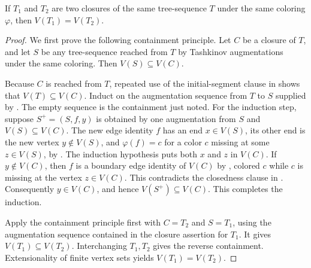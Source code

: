 \begin{lemma}
If $T_1$ and $T_2$ are two closures of the same tree-sequence $T$ under
the same coloring $\varphi$, then $V(T_1)=V(T_2)$.
\end{lemma}
\begin{proof}
We first prove the following containment principle.  Let $C$ be a closure
of $T$, and let $S$ be any tree-sequence reached from $T$ by Tashkinov
augmentations under the same coloring.  Then $V(S)\subseteq V(C)$.

Because $C$ is reached from $T$, repeated use of the initial-segment clause
in  shows that $V(T)\subseteq V(C)$.  Induct
on the augmentation sequence from $T$ to $S$ supplied by
.  The empty sequence is the
containment just noted.  For the induction step, suppose
$S^+=(S,f,y)$ is obtained by one augmentation from $S$ and
$V(S)\subseteq V(C)$.  The new edge identity $f$ has an end $x\in V(S)$,
its other end is the new vertex $y\notin V(S)$, and
$\varphi(f)=c$ for a color $c$ missing at some $z\in V(S)$, by
.  The induction hypothesis puts both $x$
and $z$ in $V(C)$.  If $y\notin V(C)$, then $f$ is a boundary edge identity
of $V(C)$ by , colored $c$ while $c$ is missing at
the vertex $z\in V(C)$.  This contradicts the closedness clause in
.  Consequently $y\in V(C)$, and hence
$V(S^+)\subseteq V(C)$.  This completes the induction.

Apply the containment principle first with $C=T_2$ and $S=T_1$, using the
augmentation sequence contained in the closure assertion for $T_1$.  It
gives $V(T_1)\subseteq V(T_2)$.  Interchanging $T_1,T_2$ gives the reverse
containment.  Extensionality of finite vertex sets yields
$V(T_1)=V(T_2)$.
\end{proof}
